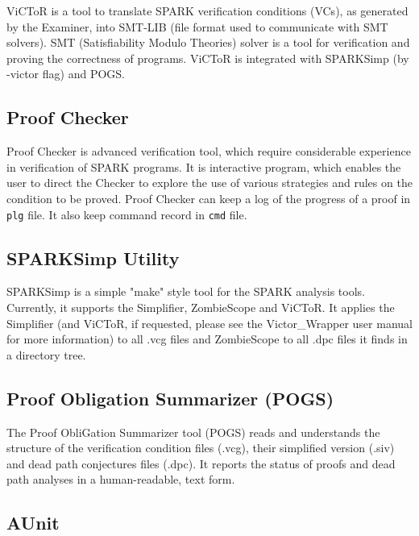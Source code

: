 ViCToR is a tool to translate SPARK verification conditions (VCs), as generated by the Examiner, into SMT-LIB (file format used to communicate with SMT solvers). \cite{Victor:Online} SMT (Satisfiability Modulo Theories) solver is a tool for verification and proving the correctness of programs. ViCToR is integrated with SPARKSimp (by -victor flag) and POGS.


\subsection{Proof Checker}
\label{verification:proofchecker}

Proof Checker is advanced verification tool, which require considerable experience in verification of SPARK programs. It is interactive program, which enables the user to direct the Checker to explore the use of various strategies and rules on the condition to be proved. Proof Checker can keep a log of the progress of a proof in \lstinline{plg} file. It also keep command record in \lstinline{cmd} file.


\subsection{SPARKSimp Utility}
\label{verification:sparksimp}
SPARKSimp is a simple "make" style tool for the SPARK analysis tools. Currently, it supports the Simplifier, ZombieScope and ViCToR. It applies the Simplifier (and ViCToR, if requested, please see the Victor\_Wrapper user manual \cite{Victor:Online} for more information) to all .vcg files and ZombieScope to all .dpc files it finds in a directory tree. \cite{SPARKSimp:Online} 


\subsection{Proof Obligation Summarizer (POGS)}
\label{verification:pogs}

The Proof ObliGation Summarizer tool (POGS) reads and understands the structure of the verification condition files (.vcg), their simplified version (.siv) and dead path conjectures files (.dpc). It reports the status of proofs and dead path analyses in a human-readable, text form. \cite{POGS:Online} 


\subsection{AUnit}
\label{background:spark:aunit}

